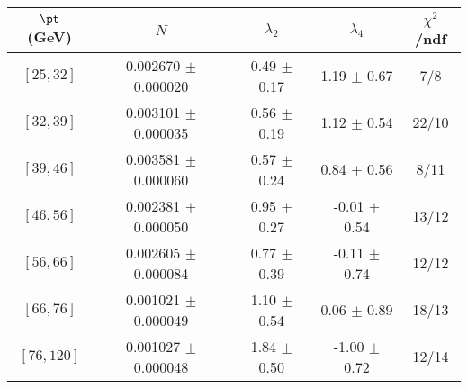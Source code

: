 \begin{tabular}{c||c|c|c|c}
$\pt$ (GeV) & $N$ & $\lambda_{2}$ & $\lambda_4$  & $\chi^2$/ndf  \\
\hline
$[25, 32]$ & 0.002670 $\pm$ 0.000020 & 0.49 $\pm$ 0.17 & 1.19 $\pm$ 0.67 & 7/8\\
$[32, 39]$ & 0.003101 $\pm$ 0.000035 & 0.56 $\pm$ 0.19 & 1.12 $\pm$ 0.54 & 22/10\\
$[39, 46]$ & 0.003581 $\pm$ 0.000060 & 0.57 $\pm$ 0.24 & 0.84 $\pm$ 0.56 & 8/11\\
$[46, 56]$ & 0.002381 $\pm$ 0.000050 & 0.95 $\pm$ 0.27 & -0.01 $\pm$ 0.54 & 13/12\\
$[56, 66]$ & 0.002605 $\pm$ 0.000084 & 0.77 $\pm$ 0.39 & -0.11 $\pm$ 0.74 & 12/12\\
$[66, 76]$ & 0.001021 $\pm$ 0.000049 & 1.10 $\pm$ 0.54 & 0.06 $\pm$ 0.89 & 18/13\\
$[76, 120]$ & 0.001027 $\pm$ 0.000048 & 1.84 $\pm$ 0.50 & -1.00 $\pm$ 0.72 & 12/14\\
\end{tabular}
